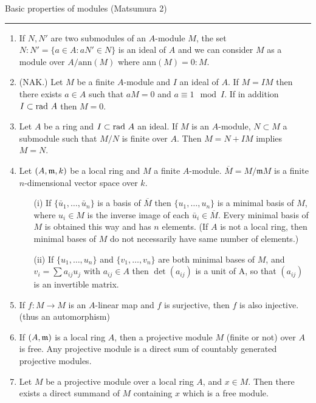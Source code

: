 \begin{notes}
    Basic properties of modules (Matsumura 2)
\end{notes}
\hrule

\begin{enumerate}
    \item
          If $N,N'$ are two submodules of an $A$-module $M$, the set $N:N'=\{a\in A: aN'\in N \}$ is an
          ideal of $A$ and we can consider $M$ as a module over $A/\text{ann}(M)$ where ann$(M)=0:M$.
          
    \item (NAK.)
          Let $M$ be a finite $A$-module and $I$ an ideal of $A$. If $M=IM$ then there exists $a\in A$ such that
          $aM=0$ and $a\equiv 1\mod{I}.$ If in addition $I\subset \text{rad }{A}$ then $M=0$.
    \item
          Let $A$ be a ring and $I\subset \text{rad }{A}$ an ideal. If $M$ is an $A$-module, $N\subset M$ a submodule such
          that $M/N$ is finite over $A$. Then $M=N+IM$ implies $M=N$.
    \item
          Let $(A,\mathfrak{m},k)$ be a local ring and $M$ a finite $A$-module. $\overbar{M}=M/\mathfrak{m}M$ is a
          finite $n$-dimensional vector space over $k$.
          \begin{enumerate}
              \item[(i)]
                    If $\{\bar{u}_1,\ldots,\bar{u}_n\}$ is a basis of $\overbar{M}$ then $\{u_1,\ldots,u_n\}$
                    is a minimal basis of $M$, where $u_i\in M$ is the inverse image of each $\bar{u}_i\in\overbar{M}$.
                    Every minimal basis of $M$ is obtained this way and has $n$ elements. (If $A$ is not a local ring,
                    then minimal bases of $M$ do not necessarily have same number of elements.)
              \item[(ii)]
                    If $\{u_1,\ldots,u_n\}$ and $\{v_1,\ldots,v_n\}$ are both minimal bases of $M$, and
                    $v_i=\sum{a_{ij}u_j}$ with $a_{ij}\in A$ then $\det{(a_{ij})}$ is a unit of A, so that $(a_{ij})$ is an
                    invertible matrix.
          \end{enumerate}
    \item If $f:M \to M$ is an $A$-linear map and $f$ is surjective, then $f$ is also injective. (thus an automorphism)
    \item If $(A,\mathfrak{m})$ is a local ring $A$, then a projective module $M$ (finite or not) over $A$ is free. Any projective
          module is a direct sum of countably generated projective modules.
    \item Let $M$ be a projective module over a local ring $A$, and $x\in M$. Then there exists a direct summand of $M$
          containing $x$ which is a free module.
\end{enumerate}